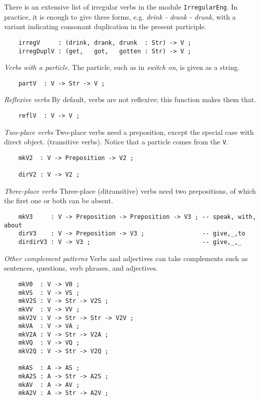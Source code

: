 \documentclass[11pt,a4paper]{article}
\newcommand{\subsubsubsection}[1]{\textit{#1}}
\begin{document}
There is an extensive list of irregular verbs in the module \texttt{IrregularEng}.
In practice, it is enough to give three forms, 
e.g. \textit{drink - drank - drunk}, with a variant indicating consonant
duplication in the present participle.

\begin{verbatim}
    irregV     : (drink, drank, drunk  : Str) -> V ;
    irregDuplV : (get,   got,   gotten : Str) -> V ;
\end{verbatim}

\subsubsubsection{Verbs with a particle.}
The particle, such as in \textit{switch on}, is given as a string.

\begin{verbatim}
    partV  : V -> Str -> V ;
\end{verbatim}

\subsubsubsection{Reflexive verbs}
By default, verbs are not reflexive; this function makes them that.

\begin{verbatim}
    reflV  : V -> V ;
\end{verbatim}

\subsubsubsection{Two-place verbs}
Two-place verbs need a preposition, except the special case with direct object.
(transitive verbs). Notice that a particle comes from the \texttt{V}.

\begin{verbatim}
    mkV2  : V -> Preposition -> V2 ;
  
    dirV2 : V -> V2 ;
\end{verbatim}

\subsubsubsection{Three-place verbs}
Three-place (ditransitive) verbs need two prepositions, of which
the first one or both can be absent.

\begin{verbatim}
    mkV3     : V -> Preposition -> Preposition -> V3 ; -- speak, with, about
    dirV3    : V -> Preposition -> V3 ;                -- give,_,to
    dirdirV3 : V -> V3 ;                               -- give,_,_
\end{verbatim}

\subsubsubsection{Other complement patterns}
Verbs and adjectives can take complements such as sentences,
questions, verb phrases, and adjectives.

\begin{verbatim}
    mkV0  : V -> V0 ;
    mkVS  : V -> VS ;
    mkV2S : V -> Str -> V2S ;
    mkVV  : V -> VV ;
    mkV2V : V -> Str -> Str -> V2V ;
    mkVA  : V -> VA ;
    mkV2A : V -> Str -> V2A ;
    mkVQ  : V -> VQ ;
    mkV2Q : V -> Str -> V2Q ;
  
    mkAS  : A -> AS ;
    mkA2S : A -> Str -> A2S ;
    mkAV  : A -> AV ;
    mkA2V : A -> Str -> A2V ;
\end{verbatim}
\end{document}
